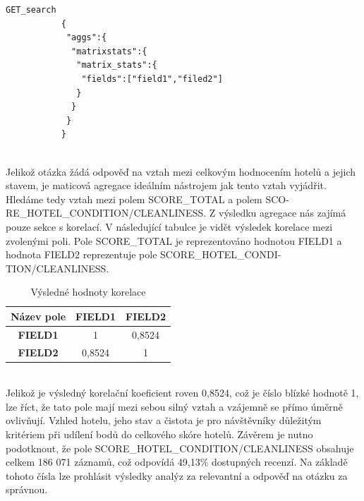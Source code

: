 \documentclass[czech,BP]{thesiskiv}
\begin{document}
\begin{lstlisting}[title={Zápis matrix\_stats}]
	       GET_search
  	       {
	        "aggs":{
	         "matrixstats":{
	          "matrix_stats":{
	           "fields":["field1","filed2"]
	          }
	         }
	        }
	       }
\end{lstlisting}
\mbox{}\\
Jelikož otázka žádá odpověď na vztah mezi celkovým hodnocením hotelů a jejich stavem, je maticová agregace ideálním nástrojem jak tento vztah vyjádřit. Hledáme tedy vztah mezi polem SCORE\_TOTAL  a polem SCO- RE\_HOTEL\_CONDITION/CLEANLINESS. Z výsledku agregace nás zajímá pouze sekce s korelací. V následující tabulce je vidět výsledek korelace mezi zvolenými poli. Pole SCORE\_TOTAL je reprezentováno hodnotou FIELD1 a hodnota FIELD2 reprezentuje pole SCORE\_HOTEL\_CONDI- TION/CLEANLINESS.
\begin{table}[h]
	\centering
	\caption{Výsledné hodnoty korelace}
	\label{my-label}
	\begin{tabular}{|c|c|c|}
		\hline
		\multicolumn{1}{|l|}{\textbf{Název pole}} & \multicolumn{1}{l|}{\textbf{FIELD1}} & \multicolumn{1}{l|}{\textbf{FIELD2}} \\ \hline
		\textbf{FIELD1} & 1 & 0,8524 \\ \hline
		\textbf{FIELD2} & 0,8524 & 1 \\ \hline
	\end{tabular}
\end{table}
\mbox{}\\
Jelikož je výsledný korelační koeficient roven 0,8524, což je číslo blízké hodnotě 1, lze říct, že tato pole mají mezi sebou silný vztah a vzájemně se přímo úměrně ovlivňují. Vzhled hotelu, jeho stav a čistota je pro návštěvníky důležitým kritériem při udílení bodů do celkového skóre hotelů. Závěrem je nutno podotknout, že pole SCORE\_HOTEL\_CONDITION/CLEANLINESS obsahuje celkem 186 071 záznamů, což odpovídá 49,13\% dostupných recenzí. Na základě tohoto čísla lze prohlásit výsledky analýz za relevantní a odpověď na otázku za správnou.
\end{document}
